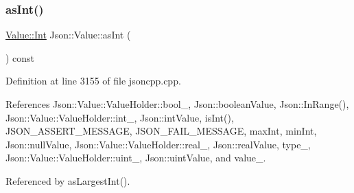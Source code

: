 \subsubsection{\texorpdfstring{as\+Int()}{asInt()}}
{\footnotesize\ttfamily \hyperlink{class_json_1_1_value_abdf7a7ff73eb130ffcab28504ffdb405}{Value\+::\+Int} Json\+::\+Value\+::as\+Int (\begin{DoxyParamCaption}{ }\end{DoxyParamCaption}) const}



Definition at line 3155 of file jsoncpp.\+cpp.



References Json\+::\+Value\+::\+Value\+Holder\+::bool\+\_\+, Json\+::boolean\+Value, Json\+::\+In\+Range(), Json\+::\+Value\+::\+Value\+Holder\+::int\+\_\+, Json\+::int\+Value, is\+Int(), J\+S\+O\+N\+\_\+\+A\+S\+S\+E\+R\+T\+\_\+\+M\+E\+S\+S\+A\+GE, J\+S\+O\+N\+\_\+\+F\+A\+I\+L\+\_\+\+M\+E\+S\+S\+A\+GE, max\+Int, min\+Int, Json\+::null\+Value, Json\+::\+Value\+::\+Value\+Holder\+::real\+\_\+, Json\+::real\+Value, type\+\_\+, Json\+::\+Value\+::\+Value\+Holder\+::uint\+\_\+, Json\+::uint\+Value, and value\+\_\+.



Referenced by as\+Largest\+Int().



